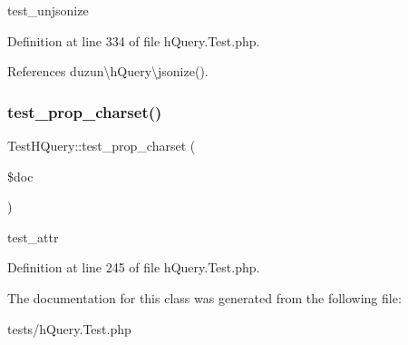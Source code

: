 test\+\_\+unjsonize 

Definition at line 334 of file h\+Query.\+Test.\+php.



References duzun\textbackslash{}h\+Query\textbackslash{}jsonize().

\mbox{\label{classTestHQuery_a4c9172bbe292403e520fe2b830079dd7}} 
\subsubsection{\texorpdfstring{test\+\_\+prop\+\_\+charset()}{test\_prop\_charset()}}
{\footnotesize\ttfamily Test\+H\+Query\+::test\+\_\+prop\+\_\+charset (\begin{DoxyParamCaption}\item[{}]{\$doc }\end{DoxyParamCaption})}

test\+\_\+attr 

Definition at line 245 of file h\+Query.\+Test.\+php.



The documentation for this class was generated from the following file\+:\begin{DoxyCompactItemize}
\item 
tests/h\+Query.\+Test.\+php\end{DoxyCompactItemize}

